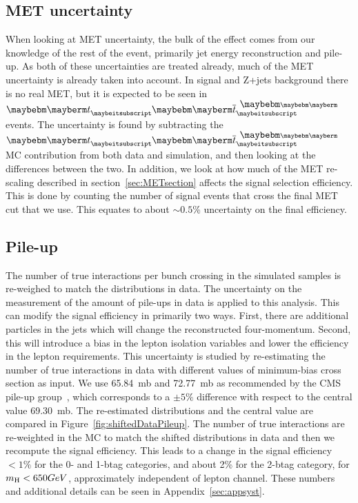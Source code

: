 
\subsection{MET uncertainty}

When looking at MET uncertainty, the bulk of the effect comes from our knowledge of the rest of the event, primarily jet energy reconstruction and pile-up.  As both of these uncertainties are treated already, much of the MET uncertainty is already taken into account.  In signal and Z+jets background there is no real MET, but it is expected to be seen in $\Pqt \Paqt$ events.  The uncertainty is found by subtracting the $\Pqt \Paqt$ MC contribution from both data and simulation, and then looking at the differences between the two. In addition, we look at how much of the MET re-scaling described in section~\ref{sec:METsection} affects the signal selection efficiency.  This is done by counting the number of signal events that cross the final MET cut that we use.  This equates to about $\sim 0.5$\% uncertainty on the final efficiency.

\subsection{Pile-up}
\label{sec:pileupSystematics}
The number of true interactions per bunch crossing in the simulated samples is re-weighed to match the distributions in data. The uncertainty on the measurement of the amount of pile-ups in data is applied to this analysis. This can modify the signal efficiency in primarily two ways.  First, there are additional particles in the jets which will change the reconstructed four-momentum.  Second, this will introduce a bias in the lepton isolation variables and lower the efficiency in the lepton requirements. 
  This uncertainty is studied by re-estimating the number of true interactions in data with different values of minimum-bias cross section as input.  We use 65.84~mb and 72.77~mb as recommended by the CMS pile-up group~\cite{pileupsys}, which corresponds to a $\pm 5\%$ difference with respect to the central value 69.30~mb. The re-estimated distributions and the central value are compared in Figure~\ref{fig:shiftedDataPileup}. The number of true interactions are re-weighted in the MC to match the shifted distributions in data and then we recompute the signal efficiency. This leads to a change in the signal efficiency $< 1\%$ for the 0- and 1-btag categories, and about 2\% for the 2-btag category, for $m_{\mathrm{H}} < 650 GeV$, approximately independent of lepton channel.  These numbers and additional details can be seen in Appendix~\ref{sec:appsyst}.

